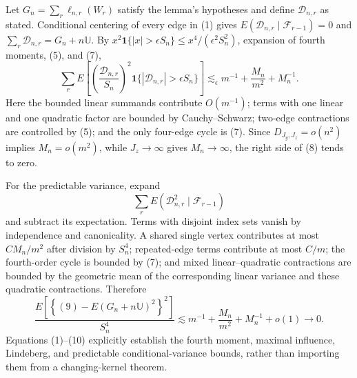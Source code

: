 Let \(G_n=\sum_r\ell_{n,r}(W_r)\) satisfy the lemma's hypotheses and define \(\mathcal D_{n,r}\) as stated. Conditional centering of every edge in (1) gives \(E(\mathcal D_{n,r}\mid\mathcal F_{r-1})=0\) and \(\sum_r\mathcal D_{n,r}=G_n+n\mathbb U\). By \(x^2\mathbf1\{|x|>\epsilon S_n\}\le x^4/(\epsilon^2S_n^2)\), expansion of fourth moments, (5), and (7),
\[
\sum_rE\left[\left(\frac{\mathcal D_{n,r}}{S_n}\right)^2
\mathbf1\{|\mathcal D_{n,r}|>\epsilon S_n\}\right]
\lesssim_\epsilon m^{-1}+\frac{M_n}{m^2}+M_n^{-1}.               \tag{8}
\]
Here the bounded linear summands contribute \(O(m^{-1})\); terms with one linear and one quadratic factor are bounded by Cauchy--Schwarz; two-edge contractions are controlled by (5); and the only four-edge cycle is (7). Since \(D_{J_y,J_z}=o(n^2)\) implies \(M_n=o(m^2)\), while \(J_z\to\infty\) gives \(M_n\to\infty\), the right side of (8) tends to zero.

For the predictable variance, expand
\[
\sum_rE(\mathcal D_{n,r}^2\mid\mathcal F_{r-1})                 \tag{9}
\]
and subtract its expectation. Terms with disjoint index sets vanish by independence and canonicality. A shared single vertex contributes at most \(CM_n/m^2\) after division by \(S_n^4\); repeated-edge terms contribute at most \(C/m\); the fourth-order cycle is bounded by (7); and mixed linear--quadratic contractions are bounded by the geometric mean of the corresponding linear variance and these quadratic contractions. Therefore
\[
\frac{E\left[\left\{(9)-E(G_n+n\mathbb U)^2\right\}^2\right]}{S_n^4}
\lesssim m^{-1}+\frac{M_n}{m^2}+M_n^{-1}+o(1)\to0.              \tag{10}
\]
Equations (1)--(10) explicitly establish the fourth moment, maximal influence, Lindeberg, and predictable conditional-variance bounds, rather than importing them from a changing-kernel theorem.